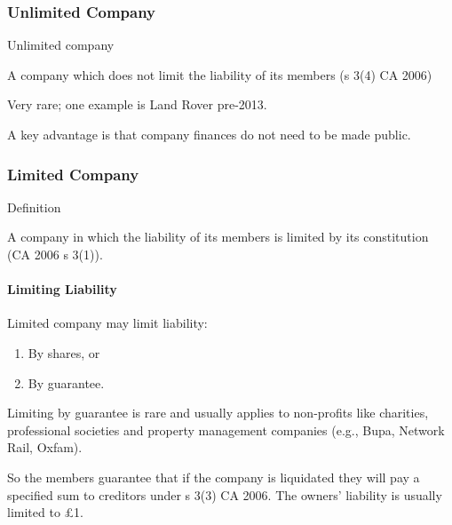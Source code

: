 \documentclass[
]{article}
\providecommand{\tightlist}{%
  \setlength{\itemsep}{0pt}\setlength{\parskip}{0pt}}
\newenvironment{env-c5a1f670-a83c-479e-bf69-eca11d8e9e55}
{
    \savenotes\tcolorbox[blanker,breakable,left=5pt,borderline west={2pt}{-4pt}{gold}]
}
{
    \endtcolorbox\spewnotes
}
\begin{document}
\hypertarget{unlimited-company}{%
\subsubsection{Unlimited Company}\label{unlimited-company}}

\begin{env-c5a1f670-a83c-479e-bf69-eca11d8e9e55}

Unlimited company

A company which does not limit the liability of its members (s 3(4) CA
2006)

\end{env-c5a1f670-a83c-479e-bf69-eca11d8e9e55}

Very rare; one example is Land Rover pre-2013.

A key advantage is that company finances do not need to be made public.

\hypertarget{limited-company}{%
\subsubsection{Limited Company}\label{limited-company}}

\begin{env-c5a1f670-a83c-479e-bf69-eca11d8e9e55}

Definition

A company in which the liability of its members is limited by its
constitution (CA 2006 s 3(1)).

\end{env-c5a1f670-a83c-479e-bf69-eca11d8e9e55}

\hypertarget{limiting-liability}{%
\paragraph{Limiting Liability}\label{limiting-liability}}

Limited company may limit liability:

\begin{enumerate}
\tightlist
\item
  By shares, or
\item
  By guarantee.
\end{enumerate}

Limiting by guarantee is rare and usually applies to non-profits like
charities, professional societies and property management companies
(e.g., Bupa, Network Rail, Oxfam).

So the members guarantee that if the company is liquidated they will pay
a specified sum to creditors under s 3(3) CA 2006. The owners' liability
is usually limited to £1.
\end{document}
